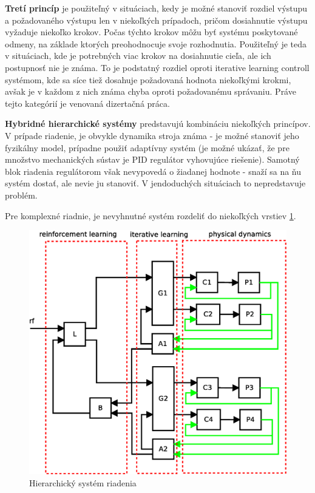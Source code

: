 {\bf Tretí princíp} je použiteľný v situáciach, kedy je možné stanoviť rozdiel
výstupu a požadovaného výstupu len v niekoľkých prípadoch, pričom dosiahnutie
výstupu vyžaduje niekoľko krokov. Počas týchto krokov môžu byť systému
poskytované odmeny, na základe ktorých preohodnocuje svoje rozhodnutia.
Použiteľný je teda v situáciach, kde je potrebných viac krokov na dosiahnutie cieľa,
ale ich postupnosť nie je známa. To je podstatný rozdiel oproti iterative learning controll
systémom, kde sa síce tiež dosahuje požadovaná hodnota niekoľkými krokmi, avšak je v každom z nich známa
chyba oproti požadovanému správaniu.
Práve tejto kategórií je venovaná dizertačná práca.

{\bf Hybridné hierarchické systémy} predstavujú kombináciu niekoľkých princípov.
V prípade riadenie, je obvykle dynamika stroja známa - je možné stanoviť jeho fyzikálny model,
prípadne použiť adaptívny systém (je možné ukázať, že pre množstvo mechanických sústav je PID
regulátor vyhovujúce riešenie). Samotný blok riadenia regulátorom však nevypovedá o žiadanej hodnote -
snaží sa na ňu systém dostať, ale nevie ju stanoviť. V jendoduchých situáciach to nepredstavuje problém.

Pre komplexné riadnie, je nevyhnutné systém rozdeliť do niekoľkých vrstiev \ref{img:hierachical_controll_system}.

\begin{figure}[!htb]
\center
\includegraphics[scale=.5]{../diagrams/hierachical_system.eps}
\caption{Hierarchický systém riadenia}
\label{img:hierachical_controll_system}
\end{figure}

